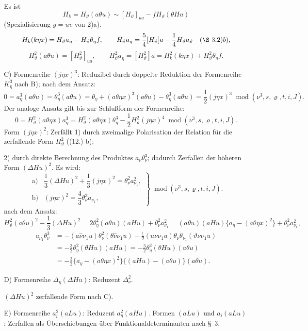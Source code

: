 \documentclass[11pt]{article}
\newcommand{\A}{\Delta}
\newcommand{\R}{\varrho}
\newcommand{\modu}[1]{\;\operatorname{mod} #1}
\begin{document}
Es ist
\[
H_k=H_\vartheta(a\theta u)\sim [H_\vartheta]_{ua}-fH_\vartheta(\theta Hu)
\]
(Spezialisierung $y=uv$ von 2)a).
\[
H_k(k\eta x)=H_\vartheta a_\eta-H_\vartheta\theta_\eta f,
\qquad
H_\vartheta a_\eta=\frac54[H_\vartheta]a-\frac14H_\vartheta a_\vartheta
\quad(\S\ 3. 2)b),
\]
\[
H_\vartheta^2(a\theta u)=[H_\vartheta^2]_{ua},
\qquad
H_\vartheta^2a_\eta=[H_\vartheta^2]a=H_k^2(k\eta x)+H_\vartheta^2\theta_\eta f.
\]

\noindent C) Formenreihe $(j\eta x)^3$: Reduzibel durch doppelte Reduktion der Formenreihe $K_\eta^3$ nach B); nach dem Ansatz:
\[
0=a_\eta^3(a\theta u)=\theta_\eta^3(a\theta u)
=\theta_\eta+(a\theta\eta x)^3(a\theta u)-\theta_\eta^3(a\theta u)
=\frac12(j\eta x)^3\modu{(\nu^3,s,\R,t,i,J)}.
\]
Der analoge Ansatz gilt bis zur Schlußform der Formenreihe:
\[
0=H_\vartheta^2(a\theta\eta x)a_\eta^3
=H_\vartheta^2(a\theta\eta x)\theta_\eta^3
-\frac12H_\vartheta^2(j\eta x)^4\modu{(\nu^3,s,\R,t,i,J)}.
\]
Form $(j\eta x)^2$: Zerfällt 1) durch zweimalige Polarisation der Relation für die zerfallende Form $H_\vartheta^2$ ((12.) b);

2) durch direkte Berechnung des Produktes $a_\nu\theta_\nu^3$; dadurch Zerfallen der höheren Form $(\A Hu)^2$. Es wird:
\[
\tag{18}
\left.\begin{array}{ll}
\text{a)}&\dfrac13(\A Hu)^2+\dfrac13(j\eta x)^2=\theta_\nu^2a_{\nu_1}^2,\\[0.6em]
\text{b)}&(j\eta x)^2=\dfrac43\theta_\nu^3a_{\nu_1},
\end{array}\right\}\modu{(\nu^3,s,\R,t,i,J)}.
\]
nach dem Ansatz:
\[
H_\vartheta^2(a\theta u)^2-\frac13(\A Hu)^2
=2\theta_\eta^2(a\theta u)(aHu)+\theta_\nu^2a_{\nu_1}^2
=(a\theta u)(aHu)\{a_\eta-(a\theta\eta x)^2\}+\theta_\nu^2a_{\nu_1}^2,
\]
\[
\begin{aligned}
a_{\nu_1}\theta_\nu^3
&=-(a\widehat{\nu}\nu_1u)\theta_\nu^2(\theta\widehat{\nu}\nu_1u)
-\frac12(u\nu\nu_1u)\theta_\nu\theta_{\nu_1}(\vartheta\nu\nu_1u)\\
&=-\frac32\theta_\eta^2(\theta Hu)(aHu)
=-\frac32\theta_\eta^2(\theta Hu)(a\theta u)\\
&=-\frac32\{a_\eta-(a\theta\eta x)^2\}\{(aHu)-(a\theta u)\}(a\theta u).
\end{aligned}
\]

\noindent D) Formenreihe $\A_\eta(\A Hu)$: Reduzent $\A_\nu^2$.

$(\A Hu)^2$ zerfallende Form nach C).

\noindent E) Formenreihe $a_i^2(aLu)$: Reduzent $a_\eta^2(aHu)$. Formen $(aLu)$ und $a_i(aLu)$: Zerfallen als Überschiebungen über Funktionaldeterminanten nach \S\ 3.
\end{document}

